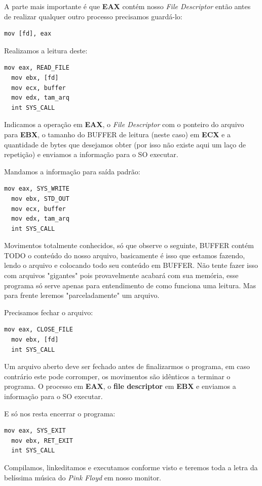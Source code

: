 A parte mais importante é que \textbf{EAX} contém nosso \textit{File Descriptor} então antes de realizar qualquer outro processo precisamos guardá-lo:
\begin{lstlisting}[]
  mov [fd], eax	
\end{lstlisting}	

Realizamos a leitura deste:
\begin{lstlisting}[]
  mov eax, READ_FILE
  mov ebx, [fd]
  mov ecx, buffer
  mov edx, tam_arq
  int SYS_CALL	
\end{lstlisting}	

Indicamos a operação em \textbf{EAX}, o \textit{File Descriptor} com o ponteiro do arquivo para \textbf{EBX}, o tamanho do BUFFER de leitura (neste caso) em \textbf{ECX} e a quantidade de bytes que desejamos obter (por isso não existe aqui um laço de repetição) e enviamos a informação para o SO executar.

Mandamos a informação para saída padrão:
\begin{lstlisting}[]
  mov eax, SYS_WRITE
  mov ebx, STD_OUT
  mov ecx, buffer
  mov edx, tam_arq
  int SYS_CALL	
\end{lstlisting}	

Movimentos totalmente conhecidos, só que observe o seguinte, BUFFER contém TODO o conteúdo do nosso arquivo, basicamente é isso que estamos fazendo, lendo o arquivo e colocando todo seu conteúdo em BUFFER. Não tente fazer isso com arquivos "gigantes" pois provavelmente acabará com sua memória, esse programa só serve apenas para entendimento de como funciona uma leitura. Mas para frente leremos "parceladamente" um arquivo.

Precisamos fechar o arquivo:
\begin{lstlisting}[]
  mov eax, CLOSE_FILE
  mov ebx, [fd]
  int SYS_CALL	
\end{lstlisting}	

Um arquivo aberto deve ser fechado antes de finalizarmos o programa, em caso contrário este pode corromper, os movimentos são idênticos a terminar o programa. O processo em \textbf{EAX}, o \textbf{file descriptor} em \textbf{EBX} e enviamos a informação para o SO executar.

E só nos resta encerrar o programa:
\begin{lstlisting}[]
  mov eax, SYS_EXIT
  mov ebx, RET_EXIT
  int SYS_CALL	
\end{lstlisting}	

Compilamos, linkeditamos e executamos conforme visto e teremos toda a letra da belíssima música do \textit{Pink Floyd} em nosso monitor.

